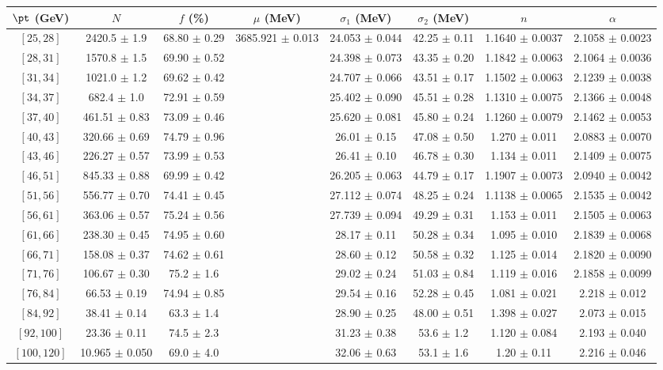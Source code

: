 \begin{tabular}{c||c|c|c|c|c|c|c}
$\pt$ (GeV) & $N$ & $f$ (\%) & $\mu$ (MeV) & $\sigma_1$ (MeV) & $\sigma_2$ (MeV) & $n$ & $\alpha$ \\
\hline
$[25, 28]$ & 2420.5 $\pm$ 1.9 & 68.80 $\pm$ 0.29 & \multirow{17}{*}{3685.921 $\pm$ 0.013} & 24.053 $\pm$ 0.044 & 42.25 $\pm$ 0.11 & 1.1640 $\pm$ 0.0037 & 2.1058 $\pm$ 0.0023\\
$[28, 31]$ & 1570.8 $\pm$ 1.5 & 69.90 $\pm$ 0.52 &  & 24.398 $\pm$ 0.073 & 43.35 $\pm$ 0.20 & 1.1842 $\pm$ 0.0063 & 2.1064 $\pm$ 0.0036\\
$[31, 34]$ & 1021.0 $\pm$ 1.2 & 69.62 $\pm$ 0.42 &  & 24.707 $\pm$ 0.066 & 43.51 $\pm$ 0.17 & 1.1502 $\pm$ 0.0063 & 2.1239 $\pm$ 0.0038\\
$[34, 37]$ & 682.4 $\pm$ 1.0 & 72.91 $\pm$ 0.59 &  & 25.402 $\pm$ 0.090 & 45.51 $\pm$ 0.28 & 1.1310 $\pm$ 0.0075 & 2.1366 $\pm$ 0.0048\\
$[37, 40]$ & 461.51 $\pm$ 0.83 & 73.09 $\pm$ 0.46 &  & 25.620 $\pm$ 0.081 & 45.80 $\pm$ 0.24 & 1.1260 $\pm$ 0.0079 & 2.1462 $\pm$ 0.0053\\
$[40, 43]$ & 320.66 $\pm$ 0.69 & 74.79 $\pm$ 0.96 &  & 26.01 $\pm$ 0.15 & 47.08 $\pm$ 0.50 & 1.270 $\pm$ 0.011 & 2.0883 $\pm$ 0.0070\\
$[43, 46]$ & 226.27 $\pm$ 0.57 & 73.99 $\pm$ 0.53 &  & 26.41 $\pm$ 0.10 & 46.78 $\pm$ 0.30 & 1.134 $\pm$ 0.011 & 2.1409 $\pm$ 0.0075\\
$[46, 51]$ & 845.33 $\pm$ 0.88 & 69.99 $\pm$ 0.42 &  & 26.205 $\pm$ 0.063 & 44.79 $\pm$ 0.17 & 1.1907 $\pm$ 0.0073 & 2.0940 $\pm$ 0.0042\\
$[51, 56]$ & 556.77 $\pm$ 0.70 & 74.41 $\pm$ 0.45 &  & 27.112 $\pm$ 0.074 & 48.25 $\pm$ 0.24 & 1.1138 $\pm$ 0.0065 & 2.1535 $\pm$ 0.0042\\
$[56, 61]$ & 363.06 $\pm$ 0.57 & 75.24 $\pm$ 0.56 &  & 27.739 $\pm$ 0.094 & 49.29 $\pm$ 0.31 & 1.153 $\pm$ 0.011 & 2.1505 $\pm$ 0.0063\\
$[61, 66]$ & 238.30 $\pm$ 0.45 & 74.95 $\pm$ 0.60 &  & 28.17 $\pm$ 0.11 & 50.28 $\pm$ 0.34 & 1.095 $\pm$ 0.010 & 2.1839 $\pm$ 0.0068\\
$[66, 71]$ & 158.08 $\pm$ 0.37 & 74.62 $\pm$ 0.61 &  & 28.60 $\pm$ 0.12 & 50.58 $\pm$ 0.32 & 1.125 $\pm$ 0.014 & 2.1820 $\pm$ 0.0090\\
$[71, 76]$ & 106.67 $\pm$ 0.30 & 75.2 $\pm$ 1.6 &  & 29.02 $\pm$ 0.24 & 51.03 $\pm$ 0.84 & 1.119 $\pm$ 0.016 & 2.1858 $\pm$ 0.0099\\
$[76, 84]$ & 66.53 $\pm$ 0.19 & 74.94 $\pm$ 0.85 &  & 29.54 $\pm$ 0.16 & 52.28 $\pm$ 0.45 & 1.081 $\pm$ 0.021 & 2.218 $\pm$ 0.012\\
$[84, 92]$ & 38.41 $\pm$ 0.14 & 63.3 $\pm$ 1.4 &  & 28.90 $\pm$ 0.25 & 48.00 $\pm$ 0.51 & 1.398 $\pm$ 0.027 & 2.073 $\pm$ 0.015\\
$[92, 100]$ & 23.36 $\pm$ 0.11 & 74.5 $\pm$ 2.3 &  & 31.23 $\pm$ 0.38 & 53.6 $\pm$ 1.2 & 1.120 $\pm$ 0.084 & 2.193 $\pm$ 0.040\\
$[100, 120]$ & 10.965 $\pm$ 0.050 & 69.0 $\pm$ 4.0 &  & 32.06 $\pm$ 0.63 & 53.1 $\pm$ 1.6 & 1.20 $\pm$ 0.11 & 2.216 $\pm$ 0.046\\
\end{tabular}
